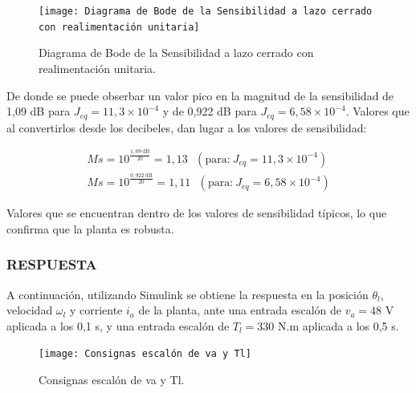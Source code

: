 \documentclass{article}
\begin{document}
\begin{sloppypar}
\begin{figure}[H]
    \centering
    \texttt{[image: Diagrama de Bode de la Sensibilidad a lazo cerrado con realimentación unitaria]}
    \caption{Diagrama de Bode de la Sensibilidad a lazo cerrado con realimentación unitaria.}
    \label{fig:Diagrama de Bode de la Sensibilidad a lazo cerrado con realimentación unitaria}
\end{figure}

De donde se puede obserbar un valor pico en la magnitud de la sensibilidad de 1,09 dB para $J_{eq}=11,3\times10^{-4}$ y de 0,922 dB para $J_{eq}=6,58\times10^{-4}$. Valores que al convertirlos desde los decibeles, dan lugar a los valores de sensibilidad:

\begin{subequations} \label{eq:Valores de Sensibilidad}
	\begin{align}
        Ms=10^{\frac{1,09 ~\text{dB}}{20}}=1,13 ~~~(\text{para:}~ J_{eq}=11,3\times10^{-4})
        \\
        Ms=10^{\frac{0,922 ~\text{dB}}{20}}=1,11 ~~~(\text{para:}~ J_{eq}=6,58\times10^{-4})
	\end{align}
\end{subequations}

Valores que se encuentran dentro de los valores de sensibilidad típicos, lo que confirma que la planta es robusta.




\subsubsection{RESPUESTA}
\label{sec:RESPUESTA}

A continuación, utilizando Simulink se obtiene la respuesta en la posición $\theta_l$, velocidad $\omega_l$ y corriente $i_a$ de la planta, ante una entrada escalón de $v_a=48$ V aplicada a los 0,1 s, y una entrada escalón de $T_l=330$ N.m aplicada a los 0,5 s.

\begin{figure}[H]
    \centering
    \texttt{[image: Consignas escalón de va y Tl]}
    \caption{Consignas escalón de va y Tl.}
    \label{fig:Consignas escalón de va y Tl}
\end{figure}


\end{sloppypar}
\end{document}
